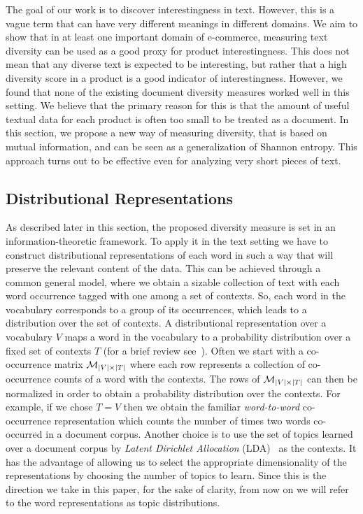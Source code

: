 The goal of our work is to discover interestingness in text. However,
this is a vague term that can have very different meanings in different
domains. We aim to show that in at least one important domain of
e-commerce, measuring text diversity can be used as a good proxy for 
product interestingness. This does not mean that any diverse text is
expected to be interesting, but rather that a high diversity score in
a product is a good indicator of interestingness. However, we found
that none of the existing 
document diversity measures worked well in this setting. We believe
that the primary reason for this is that the amount of useful textual
data for each product is often too small to be treated as a document. 
In this section, we propose a new way of measuring diversity, that is
based on mutual information, and can be seen as a generalization of
Shannon entropy. This approach turns out to be effective even for
analyzing very short pieces of text. 


\subsection{Distributional Representations}
\label{sec:distributional-representations}
As described later in this section, the proposed diversity measure
is set in an information-theoretic framework. 
To apply it in the text setting we have to construct distributional
representations of each word in such a way that will preserve the
relevant content of the data.
This can be achieved through a common general model,
where we obtain a sizable collection of text with each word
occurrence tagged with one among a set of
contexts. 
So, each word in the vocabulary
corresponds to a group of its occurrences, which leads to a
distribution over the set of contexts. A distributional representation
over a vocabulary $V$ maps a word in the vocabulary to a  
probability distribution over a fixed set of contexts $T$  (for a brief review
see~\cite{Turian10wordrepresentations}). Often we start with a
co-occurrence matrix ${\mathcal M}_{|V|\times|T|}$ where each row represents a
collection of co-occurrence counts of a word with the contexts. The
rows of ${\mathcal M}_{|V|\times|T|}$ can then  be normalized in order to
obtain a probability distribution over the contexts.
For example, if we chose $T=V$ then we obtain the familiar {\sl
  word-to-word} co-occurrence representation which counts the number 
of times two words co-occurred in a document corpus. Another choice is
to use the set of topics learned over a document 
corpus by {\sl Latent Dirichlet Allocation}
(LDA)~\cite{Blei:2003:LDA:944919.944937} as the contexts. It has the
advantage of allowing us to select the appropriate dimensionality of
the representations by choosing the number of topics to learn. Since
this is the direction we take in this paper, for the sake
of clarity, from now on we will refer to the
word representations as topic distributions. 

